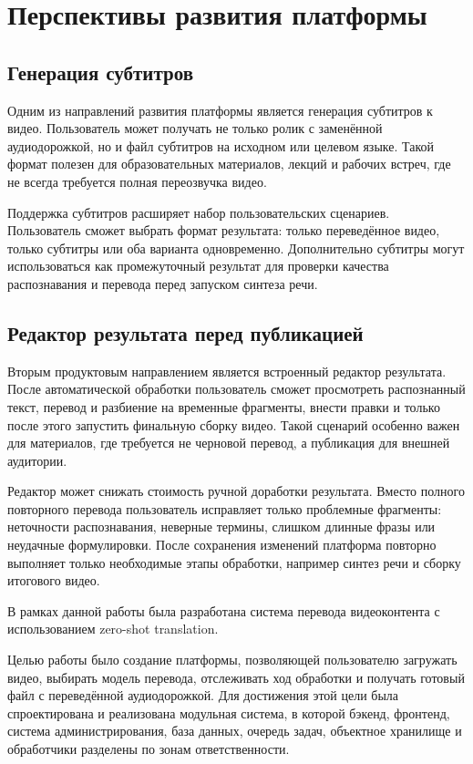 \documentclass[a4paper,article,14pt]{extarticle}
\begin{document}
\newpage
\section{Перспективы развития платформы}

\subsection{Генерация субтитров}

Одним из направлений развития платформы является генерация субтитров к видео. Пользователь может получать не только ролик с заменённой аудиодорожкой, но и файл субтитров на исходном или целевом языке. Такой формат полезен для образовательных материалов, лекций и рабочих встреч, где не всегда требуется полная переозвучка видео.

Поддержка субтитров расширяет набор пользовательских сценариев. Пользователь сможет выбрать формат результата: только переведённое видео, только субтитры или оба варианта одновременно. Дополнительно субтитры могут использоваться как промежуточный результат для проверки качества распознавания и перевода перед запуском синтеза речи.

\subsection{Редактор результата перед публикацией}

Вторым продуктовым направлением является встроенный редактор результата. После автоматической обработки пользователь сможет просмотреть распознанный текст, перевод и разбиение на временные фрагменты, внести правки и только после этого запустить финальную сборку видео. Такой сценарий особенно важен для материалов, где требуется не черновой перевод, а публикация для внешней аудитории.

Редактор может снижать стоимость ручной доработки результата. Вместо полного повторного перевода пользователь исправляет только проблемные фрагменты: неточности распознавания, неверные термины, слишком длинные фразы или неудачные формулировки. После сохранения изменений платформа повторно выполняет только необходимые этапы обработки, например синтез речи и сборку итогового видео.

\newpage
{}

В рамках данной работы была разработана система перевода видеоконтента с использованием zero-shot translation.

Целью работы было создание платформы, позволяющей пользователю загружать видео, выбирать модель перевода, отслеживать ход обработки и получать готовый файл с переведённой аудиодорожкой. Для достижения этой цели была спроектирована и реализована модульная система, в которой бэкенд, фронтенд, система администрирования, база данных, очередь задач, объектное хранилище и обработчики разделены по зонам ответственности.
\end{document}
